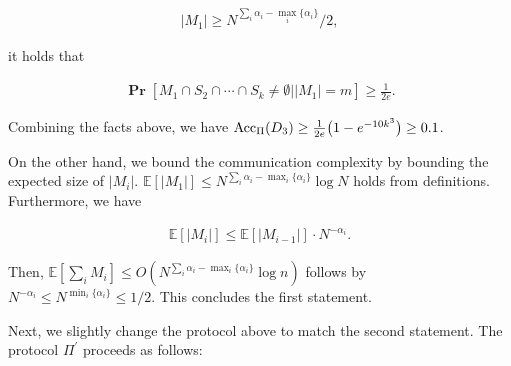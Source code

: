 \documentclass[10pt,a4paper]{article}
\begin{document}
\[\begin{gathered}
|M_{1}|\geq N^{\sum_{i}\alpha_{i}-\mathop{\max}_{i}\{\alpha_{i}\}}/2,
\end{gathered}\]


it holds that\par


\[\begin{gathered}
\operatorname*{\mathbf{Pr}}[M_{1}\cap S_{2}\cap\cdots\cap S_{k}\neq\emptyset||M_{1}|=m]\geq\frac{1}{2e}.
\end{gathered}\]


Combining the facts above, we have $\text{Acc}_{\Pi}(D_{3})\geq\frac{1}{2e}\big{(}1-e^{-10k^{3}}\big{)}\geq 0.1$.\par




On the other hand, we bound the communication complexity by bounding the expected size of $|M_{i}|$. $\mathbb{E}[|M_{1}|]\leq N^{\sum_{i}\alpha_{i}-\mathop{\max}_{i}\{\alpha_{i}\}}\log
N$ holds from definitions. Furthermore, we have\par


\[\begin{gathered}
\mathbb{E}[|M_{i}|]\leq\mathbb{E}[|M_{i-1}|]\cdot N^{-\alpha_{i}}.
\end{gathered}\]


Then, $\mathbb{E}[\sum_{i}M_{i}]\leq O(N^{\sum_{i}\alpha_{i}-\mathop{\max}_{i}\{\alpha_{i}\}}\log n)$ follows by $N^{-\alpha_{i}}\leq N^{\min_{i}\{\alpha_{i}\}}\leq 1/2$. This concludes the first statement.\par




Next, we slightly change the protocol above to match the second statement. The protocol $\Pi^{\prime}$ proceeds as follows:\par
\end{document}
